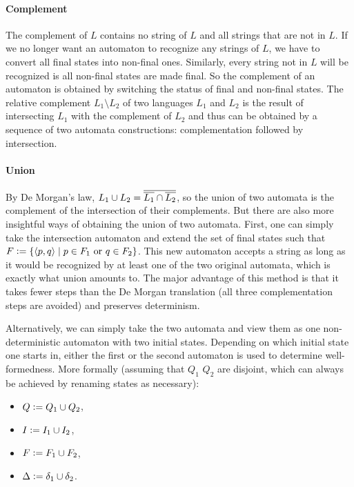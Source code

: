 \paragraph{Complement}
The complement of $L$ contains no string of $L$ and all strings that are not in $L$.
If we no longer want an automaton to recognize any strings of $L$, we have to convert all final states into non-final ones.
Similarly, every string not in $L$ will be recognized is all non-final states are made final.
So the complement of an automaton is obtained by switching the status of final and non-final states.
The relative complement $L_1 \setminus L_2$ of two languages $L_1$ and $L_2$ is the result of intersecting $L_1$ with the complement of $L_2$ and thus can be obtained by a sequence of two automata constructions: complementation followed by intersection.

\paragraph{Union}
By De Morgan's law, $L_1 \cup L_2 =  \overline{ \overline{L_1}  \cap  \overline{L_2} } $, so the union of two automata is the complement of the intersection of their complements.
But there are also more insightful ways of obtaining the union of two automata.
First, one can simply take the intersection automaton and extend the set of final states such that $F \mathrel{\mathop:}= \left \{ \left \langle p,q \right \rangle  \mid p \in F_1 \text{ or } q \in F_2 \right \}$.
This new automaton accepts a string as long as it would be recognized by at least one of the two original automata, which is exactly what union amounts to.
The major advantage of this method is that it takes fewer steps than the De Morgan translation (all three complementation steps are avoided) and preserves determinism.

Alternatively, we can simply take the two automata and view them as one non-deterministic automaton with two initial states.
Depending on which initial state one starts in, either the first or the second automaton is used to determine well-formedness.
More formally (assuming that $Q_1$ $Q_2$ are disjoint, which can always be achieved by renaming states as necessary):
%
\begin{itemize}
    \item $Q \mathrel{\mathop:}= Q_1 \cup Q_2$,
    \item $I \mathrel{\mathop:}= I_1 \cup I_2$,
    \item $F \mathrel{\mathop:}= F_1 \cup F_2$,
    \item $\Delta \mathrel{\mathop:}= \delta_1 \cup \delta_2$.
\end{itemize}


